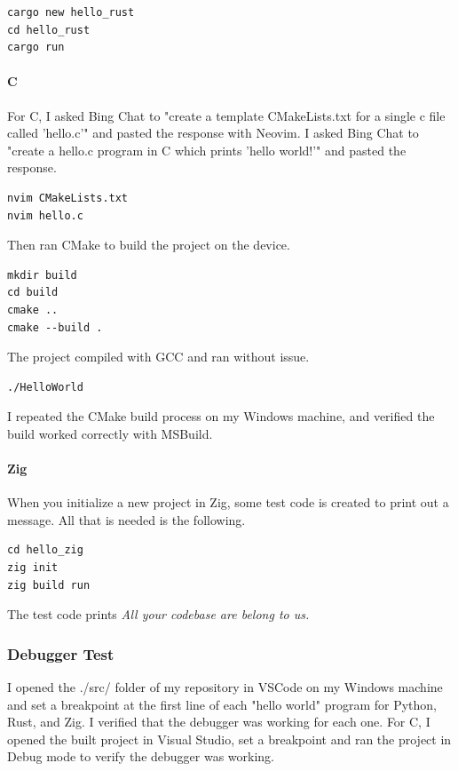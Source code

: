 \documentclass[12pt]{article}
\begin{document}
\begin{lstlisting}
cargo new hello_rust
cd hello_rust
cargo run
\end{lstlisting}

\paragraph{C}
For C, I asked Bing Chat to "create a template CMakeLists.txt for a single c file called 'hello.c'" and pasted the response with Neovim.
I asked Bing Chat to "create a hello.c program in C which prints 'hello world!'" and pasted the response.

\begin{lstlisting}
nvim CMakeLists.txt
nvim hello.c
\end{lstlisting}

Then ran CMake to build the project on the device.

\begin{lstlisting}
mkdir build
cd build
cmake ..
cmake --build .
\end{lstlisting}

The project compiled with GCC and ran without issue.

\begin{lstlisting}
./HelloWorld
\end{lstlisting}

I repeated the CMake build process on my Windows machine, and verified the build worked correctly with MSBuild.

\paragraph{Zig}
When you initialize a new project in Zig, some test code is created to print out a message. All that is needed is the following.

\begin{lstlisting}
cd hello_zig
zig init
zig build run
\end{lstlisting}

The test code prints \textit{All your codebase are belong to us.}

\subsubsection{Debugger Test}
I opened the ./src/ folder of my repository in VSCode on my Windows machine and set a breakpoint at the first line of each "hello world" program for Python, Rust, and Zig. I verified that the debugger was working for each one. For C, I opened the built project in Visual Studio, set a breakpoint and ran the project in Debug mode to verify the debugger was working.
\end{document}
